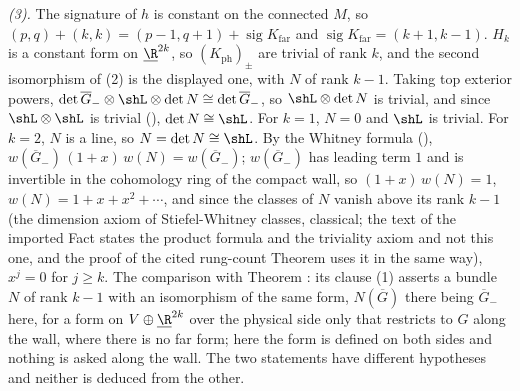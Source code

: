 \emph{(3).} The signature of $h$ is constant on the connected $M$, so $(p,q) + (k,k) = (p-1,q+1) + \operatorname{sig}K_{\mathrm{far}}$ and $\operatorname{sig}K_{\mathrm{far}} = (k+1,k-1)$. $H_{k}$ is a constant form on $\underline{\R}^{2k}$, so $(K_{\mathrm{ph}})_{\pm}$ are trivial of rank $k$, and the second isomorphism of (2) is the displayed one, with $N$ of rank $k - 1$. Taking top exterior powers, $\det\overline G_{-} \otimes \shL \otimes \det N \cong \det\overline G_{-}$, so $\shL \otimes \det N$ is trivial, and since $\shL \otimes \shL$ is trivial (), $\det N \cong \shL$. For $k = 1$, $N = 0$ and $\shL$ is trivial. For $k = 2$, $N$ is a line, so $N = \det N \cong \shL$. By the Whitney formula (), $w(\overline G_{-})\,(1 + x)\,w(N) = w(\overline G_{-})$; $w(\overline G_{-})$ has leading term $1$ and is invertible in the cohomology ring of the compact wall, so $(1 + x)\,w(N) = 1$, $w(N) = 1 + x + x^{2} + \cdots$, and since the classes of $N$ vanish above its rank $k - 1$ (the dimension axiom of Stiefel-Whitney classes, classical; the text of the imported Fact states the product formula and the triviality axiom and not this one, and the proof of the cited rung-count Theorem uses it in the same way), $x^{j} = 0$ for $j \geq k$. The comparison with Theorem : its clause (1) asserts a bundle $N$ of rank $k - 1$ with an isomorphism of the same form, $N(\overline G)$ there being $\overline G_{-}$ here, for a form on $V \oplus \underline{\R}^{2k}$ over the physical side only that restricts to $G$ along the wall, where there is no far form; here the form is defined on both sides and nothing is asked along the wall. The two statements have different hypotheses and neither is deduced from the other.


